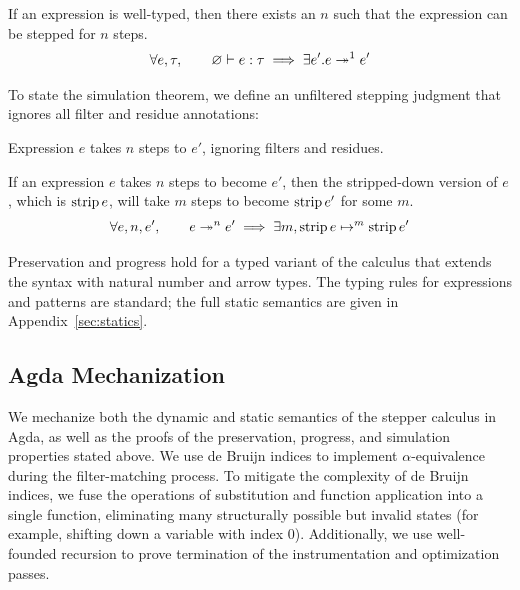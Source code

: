 \begin{theorem}[Progress]\label{thm:progress}
  If an expression is well-typed, then there exists an \(n\) such that the expression can be stepped for \(n\) steps.
  \[
    \forall e, \tau, \qquad
    \TypeEntails{\varnothing}{e}{\tau} \implies \exists e' . \Step{e}{e'}{1}
  \]
\end{theorem}

To state the simulation theorem, we define an unfiltered stepping
judgment that ignores all filter and residue annotations:

 Expression \(e\) takes \(n\) steps to \(e'\), ignoring filters and residues.
\begin{mathpar}
\end{mathpar}

\begin{theorem}[Simulation]\label{thm:simulation}
  If an expression \(e\) takes \(n\) steps to become \(e'\), then the stripped-down version of \(e\), which is \(\Strip{e}\), will take \(m\) steps to become \(\Strip{e'}\) for some \(m\).
  \[
    \forall e, n, e', \qquad
    \Step{e}{e'}{n} \implies \exists m, \JustStep{\Strip{e}}{\Strip{e'}}{m}
  \]
\end{theorem}

Preservation and progress hold for a typed variant of the calculus
that extends the syntax with natural number and arrow types. The
typing rules for expressions and patterns are standard; the full
static semantics are given in Appendix~\ref{sec:statics}.

\subsection{Agda Mechanization}

We mechanize both the dynamic and static semantics of the stepper
calculus in Agda, as well as the proofs of the preservation, progress,
and simulation properties stated above. We use de Bruijn indices to
implement \(\alpha\)-equivalence during the filter-matching process.
To mitigate the complexity of de Bruijn indices, we fuse the
operations of substitution and function application into a single
function, eliminating many structurally possible but invalid states
(for example, shifting down a variable with index 0). Additionally,
we use well-founded recursion to prove termination of the
instrumentation and optimization passes.

